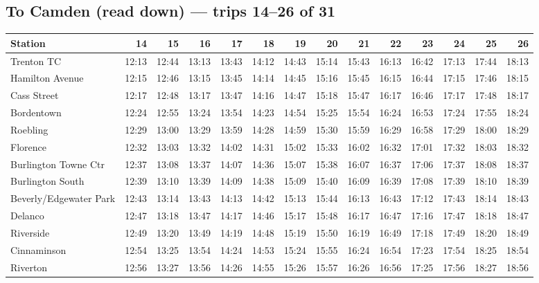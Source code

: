 \subsection*{To Camden (read down) --- trips 14--26 of 31}
\begin{center}\footnotesize\setlength{\tabcolsep}{3pt}\begin{tabular}{@{}lrrrrrrrrrrrrr@{}}\toprule
Station & 14 & 15 & 16 & 17 & 18 & 19 & 20 & 21 & 22 & 23 & 24 & 25 & 26 \\\midrule
Trenton TC & 12:13 & 12:44 & 13:13 & 13:43 & 14:12 & 14:43 & 15:14 & 15:43 & 16:13 & 16:42 & 17:13 & 17:44 & 18:13 \\
Hamilton Avenue & 12:15 & 12:46 & 13:15 & 13:45 & 14:14 & 14:45 & 15:16 & 15:45 & 16:15 & 16:44 & 17:15 & 17:46 & 18:15 \\
Cass Street & 12:17 & 12:48 & 13:17 & 13:47 & 14:16 & 14:47 & 15:18 & 15:47 & 16:17 & 16:46 & 17:17 & 17:48 & 18:17 \\
Bordentown & 12:24 & 12:55 & 13:24 & 13:54 & 14:23 & 14:54 & 15:25 & 15:54 & 16:24 & 16:53 & 17:24 & 17:55 & 18:24 \\
Roebling & 12:29 & 13:00 & 13:29 & 13:59 & 14:28 & 14:59 & 15:30 & 15:59 & 16:29 & 16:58 & 17:29 & 18:00 & 18:29 \\
Florence & 12:32 & 13:03 & 13:32 & 14:02 & 14:31 & 15:02 & 15:33 & 16:02 & 16:32 & 17:01 & 17:32 & 18:03 & 18:32 \\
Burlington Towne Ctr & 12:37 & 13:08 & 13:37 & 14:07 & 14:36 & 15:07 & 15:38 & 16:07 & 16:37 & 17:06 & 17:37 & 18:08 & 18:37 \\
Burlington South & 12:39 & 13:10 & 13:39 & 14:09 & 14:38 & 15:09 & 15:40 & 16:09 & 16:39 & 17:08 & 17:39 & 18:10 & 18:39 \\
Beverly/Edgewater Park & 12:43 & 13:14 & 13:43 & 14:13 & 14:42 & 15:13 & 15:44 & 16:13 & 16:43 & 17:12 & 17:43 & 18:14 & 18:43 \\
Delanco & 12:47 & 13:18 & 13:47 & 14:17 & 14:46 & 15:17 & 15:48 & 16:17 & 16:47 & 17:16 & 17:47 & 18:18 & 18:47 \\
Riverside & 12:49 & 13:20 & 13:49 & 14:19 & 14:48 & 15:19 & 15:50 & 16:19 & 16:49 & 17:18 & 17:49 & 18:20 & 18:49 \\
Cinnaminson & 12:54 & 13:25 & 13:54 & 14:24 & 14:53 & 15:24 & 15:55 & 16:24 & 16:54 & 17:23 & 17:54 & 18:25 & 18:54 \\
Riverton & 12:56 & 13:27 & 13:56 & 14:26 & 14:55 & 15:26 & 15:57 & 16:26 & 16:56 & 17:25 & 17:56 & 18:27 & 18:56 \\

\end{tabular}
\end{center}
